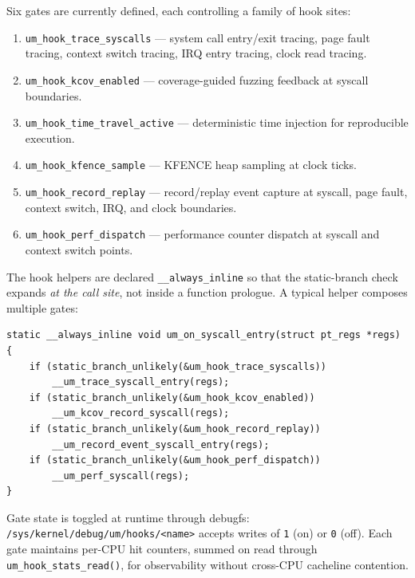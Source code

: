 Six gates are currently defined, each controlling a family of hook sites:

\begin{enumerate}[leftmargin=2em, itemsep=2pt]
\item \texttt{um\_hook\_trace\_syscalls} --- system call entry/exit tracing,
  page fault tracing, context switch tracing, IRQ entry tracing, clock read
  tracing.
\item \texttt{um\_hook\_kcov\_enabled} --- coverage-guided fuzzing feedback
  at syscall boundaries.
\item \texttt{um\_hook\_time\_travel\_active} --- deterministic time injection
  for reproducible execution.
\item \texttt{um\_hook\_kfence\_sample} --- KFENCE heap sampling at clock ticks.
\item \texttt{um\_hook\_record\_replay} --- record/replay event capture at
  syscall, page fault, context switch, IRQ, and clock boundaries.
\item \texttt{um\_hook\_perf\_dispatch} --- performance counter dispatch at
  syscall and context switch points.
\end{enumerate}

The hook helpers are declared \texttt{\_\_always\_inline} so that the
static-branch check expands \emph{at the call site}, not inside a function
prologue.  A typical helper composes multiple gates:

\begin{lstlisting}[language=KernelC, caption={The \texttt{um\_on\_syscall\_entry}
  hook helper composes four gates into a single inline expansion.},
  label={lst:hook-helper}]
static __always_inline void um_on_syscall_entry(struct pt_regs *regs)
{
    if (static_branch_unlikely(&um_hook_trace_syscalls))
        __um_trace_syscall_entry(regs);
    if (static_branch_unlikely(&um_hook_kcov_enabled))
        __um_kcov_record_syscall(regs);
    if (static_branch_unlikely(&um_hook_record_replay))
        __um_record_event_syscall_entry(regs);
    if (static_branch_unlikely(&um_hook_perf_dispatch))
        __um_perf_syscall(regs);
}
\end{lstlisting}

Gate state is toggled at runtime through debugfs:
\texttt{/sys/kernel/debug/um/hooks/<name>} accepts writes of \texttt{1} (on)
or \texttt{0} (off).  Each gate maintains per-CPU hit counters, summed
on read through \texttt{um\_hook\_stats\_read()}, for observability without
cross-CPU cacheline contention.


